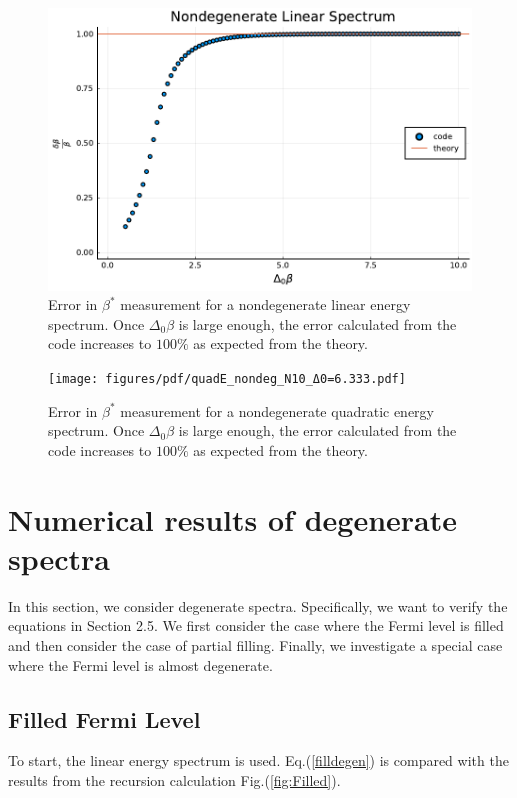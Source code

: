 \begin{figure}[H]
    \centering
    \includegraphics[scale=.75]{figures/pdf/linE_nondeg_N10.pdf}
    \caption{Error in $\beta^*$ measurement for a nondegenerate linear energy spectrum. Once $\Delta_0\beta$ is large enough, the error calculated from the code increases to $100\%$ as expected from the theory. }
    \label{fig:linnondeg}
\end{figure}

\begin{figure}[H]
    \centering
    \texttt{[image: figures/pdf/quadE\_nondeg\_N10\_Δ0=6.333.pdf]}
    \caption{Error in $\beta^*$ measurement for a nondegenerate quadratic energy spectrum. Once $\Delta_0\beta$ is large enough, the error calculated from the code increases to $100\%$ as expected from the theory. }
    \label{fig:quadnondeg}
\end{figure}


\section{Numerical results of degenerate spectra}
In this section, we consider degenerate spectra. Specifically, we want to verify the equations in Section 2.5. We first consider the case where the Fermi level is filled and then consider the case of partial filling. Finally, we investigate a special case where the Fermi level is almost degenerate. 
\subsection{Filled Fermi Level}
To start, the linear energy spectrum is used. Eq.\@ (\ref{filldegen}) is compared with the results from the recursion calculation Fig.\@ (\ref{fig:Filled}).  

